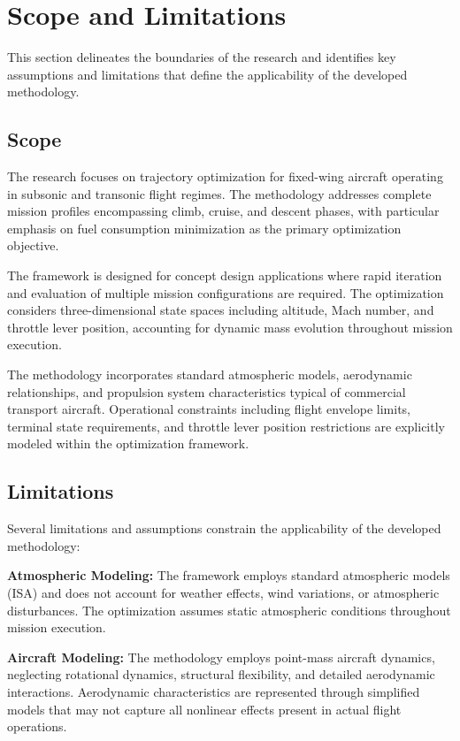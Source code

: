 \section{Scope and Limitations}

This section delineates the boundaries of the research and identifies key assumptions and limitations that define the applicability of the developed methodology.

\subsection{Scope}

The research focuses on trajectory optimization for fixed-wing aircraft operating in subsonic and transonic flight regimes. The methodology addresses complete mission profiles encompassing climb, cruise, and descent phases, with particular emphasis on fuel consumption minimization as the primary optimization objective.

The framework is designed for concept design applications where rapid iteration and evaluation of multiple mission configurations are required. The optimization considers three-dimensional state spaces including altitude, Mach number, and throttle lever position, accounting for dynamic mass evolution throughout mission execution.

The methodology incorporates standard atmospheric models, aerodynamic relationships, and propulsion system characteristics typical of commercial transport aircraft. Operational constraints including flight envelope limits, terminal state requirements, and throttle lever position restrictions are explicitly modeled within the optimization framework.

\subsection{Limitations}

Several limitations and assumptions constrain the applicability of the developed methodology:

\textbf{Atmospheric Modeling:} The framework employs standard atmospheric models (ISA) and does not account for weather effects, wind variations, or atmospheric disturbances. The optimization assumes static atmospheric conditions throughout mission execution.

\textbf{Aircraft Modeling:} The methodology employs point-mass aircraft dynamics, neglecting rotational dynamics, structural flexibility, and detailed aerodynamic interactions. Aerodynamic characteristics are represented through simplified models that may not capture all nonlinear effects present in actual flight operations.


